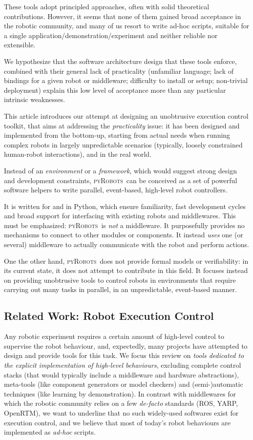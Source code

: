 \documentclass[a4paper, 10pt, conference]{ieeeconf}      %
\newcommand{\pyRobots}{\textsc{pyRobots}\ }
\begin{document}
These tools adopt principled approaches, often with solid theoretical
contributions. However, it seems that none of them gained broad acceptance in
the robotic community, and many of us resort to write ad-hoc scripts, suitable
for a single application/demonstration/experiment and neither reliable nor
extensible.

We hypothesize that the software architecture design that these tools enforce,
combined with their general lack of practicality (unfamiliar language; lack of
bindings for a given robot or middleware; difficulty to install or setup;
non-trivial deployment) explain this low level of acceptance more than any
particular intrinsic weaknesses.

This article introduces our attempt at designing an unobtrusive execution control
toolkit, that aims at addressing the \emph{practicality} issue: it has been
designed and implemented from the bottom-up, starting from actual needs when
running complex robots in largely unpredictable scenarios (typically,
loosely constrained human-robot interactions), and in the real world.

Instead of an \emph{environment} or a \emph{framework}, which would suggest
strong design and development constraints, \pyRobots can be conceived as a set of
powerful software helpers to write parallel, event-based, high-level robot
controllers.

It is written for and in Python, which ensure familiarity, fast development
cycles and broad support for interfacing with existing robots and middlewares.
This must be emphasized: \pyRobots is \emph{not} a middleware. It purposefully
provides no mechanisms to connect to other modules or components. It instead
\emph{uses} one (or several) middleware to actually communicate with the robot
and perform actions.

One the other hand, \pyRobots does not provide formal models or verifiability:
in its current state, it does not attempt to contribute in this field. It
focuses instead on providing unobtrusive tools to control robots in environments
that require carrying out many tasks in parallel, in an unpredictable,
event-based manner.

\subsection{Related Work: Robot Execution Control}

Any robotic experiment requires a certain amount of high-level control to
supervise the robot behaviour, and, expectedly, many projects have attempted to
design and provide tools for this task.  We focus this review on \emph{tools
dedicated to the explicit implementation of high-level behaviours}, excluding
complete control stacks (that would typically include a middleware and hardware
abstractions), meta-tools (like component generators or model checkers) and
(semi-)automatic techniques (like learning by demonstration).  In contrast with
middlewares for which the robotic community relies on a few \emph{de-facto}
standards (ROS, YARP, OpenRTM), we want to underline that no such widely-used
softwares exist for execution control, and we believe that most of today's robot
behaviours are implemented as \emph{ad-hoc} scripts.
\end{document}
